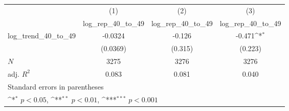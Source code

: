 {
\def\sym#1{\ifmmode^{#1}\else\(^{#1}\)\fi}
\begin{tabular}{l*{3}{c}}
\hline\hline
            &\multicolumn{1}{c}{(1)}&\multicolumn{1}{c}{(2)}&\multicolumn{1}{c}{(3)}\\
            &\multicolumn{1}{c}{log\_rep\_40\_to\_49}&\multicolumn{1}{c}{log\_rep\_40\_to\_49}&\multicolumn{1}{c}{log\_rep\_40\_to\_49}\\
\hline
log\_trend\_40\_to\_49&     -0.0324         &      -0.126         &      -0.471\sym{*}  \\
            &    (0.0369)         &     (0.315)         &     (0.223)         \\
\hline
\(N\)       &        3275         &        3276         &        3276         \\
adj. \(R^{2}\)&       0.083         &       0.081         &       0.040         \\
\hline\hline
\multicolumn{4}{l}{\footnotesize Standard errors in parentheses}\\
\multicolumn{4}{l}{\footnotesize \sym{*} \(p<0.05\), \sym{**} \(p<0.01\), \sym{***} \(p<0.001\)}\\
\end{tabular}
}
